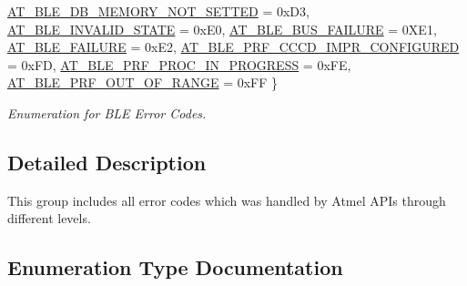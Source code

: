 \begin{DoxyCompactItemize}
\mbox{\hyperlink{group__error__codes__group_gga3b1db9b95feb157b3c188ca27fe76988a472e95c71c30f5debb8c0e814f1fcb9e}{A\+T\+\_\+\+B\+L\+E\+\_\+\+D\+B\+\_\+\+M\+E\+M\+O\+R\+Y\+\_\+\+N\+O\+T\+\_\+\+S\+E\+T\+T\+ED}} = 0x\+D3, 
\mbox{\hyperlink{group__error__codes__group_gga3b1db9b95feb157b3c188ca27fe76988a45fc5f0fc5037260c589c9013b48e2f5}{A\+T\+\_\+\+B\+L\+E\+\_\+\+I\+N\+V\+A\+L\+I\+D\+\_\+\+S\+T\+A\+TE}} = 0x\+E0, 
\newline
\mbox{\hyperlink{group__error__codes__group_gga3b1db9b95feb157b3c188ca27fe76988a5f239a37855c246718b7129533c215c8}{A\+T\+\_\+\+B\+L\+E\+\_\+\+B\+U\+S\+\_\+\+F\+A\+I\+L\+U\+RE}} = 0X\+E1, 
\mbox{\hyperlink{group__error__codes__group_gga3b1db9b95feb157b3c188ca27fe76988ac345aa57ea63207c65158bfac760799c}{A\+T\+\_\+\+B\+L\+E\+\_\+\+F\+A\+I\+L\+U\+RE}} = 0x\+E2, 
\mbox{\hyperlink{group__error__codes__group_gga3b1db9b95feb157b3c188ca27fe76988af6612bf02722a1f90902002124e8d5b4}{A\+T\+\_\+\+B\+L\+E\+\_\+\+P\+R\+F\+\_\+\+C\+C\+C\+D\+\_\+\+I\+M\+P\+R\+\_\+\+C\+O\+N\+F\+I\+G\+U\+R\+ED}} = 0x\+FD, 
\mbox{\hyperlink{group__error__codes__group_gga3b1db9b95feb157b3c188ca27fe76988aaad93a02215ebd7bb500352fb696dcfc}{A\+T\+\_\+\+B\+L\+E\+\_\+\+P\+R\+F\+\_\+\+P\+R\+O\+C\+\_\+\+I\+N\+\_\+\+P\+R\+O\+G\+R\+E\+SS}} = 0x\+FE, 
\newline
\mbox{\hyperlink{group__error__codes__group_gga3b1db9b95feb157b3c188ca27fe76988a8818c052830c133364946f9424d259d5}{A\+T\+\_\+\+B\+L\+E\+\_\+\+P\+R\+F\+\_\+\+O\+U\+T\+\_\+\+O\+F\+\_\+\+R\+A\+N\+GE}} = 0x\+FF
 \}
\begin{DoxyCompactList}\small\item\em Enumeration for B\+LE Error Codes. \end{DoxyCompactList}\end{DoxyCompactItemize}


\subsection{Detailed Description}
This group includes all error codes which was handled by Atmel A\+P\+Is through different levels. 



\subsection{Enumeration Type Documentation}
\mbox{\label{group__error__codes__group_ga3b1db9b95feb157b3c188ca27fe76988}} 
